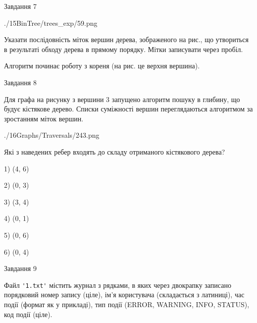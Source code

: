 \documentclass[12pt, ukrainian]{article}
\def\code#1{\Verb!#1!}
\begin{document}
{\vspace{10mm}\par

\newpage
\begin{minipage}[t]{9.7cm}
               
{\begin{center}Завдання {7}\end{center}}
\vspace{-6mm}

\begin{center}
	{./15BinTree/trees_exp/59.png}
\end{center}
Указати послідовність міток вершин дерева, зображеного на рис., що утвориться в результаті обходу дерева в прямому порядку. Мітки записувати через пробіл.\par Алгоритм починає роботу з кореня (на рис. це верхня вершина).\par

\end{minipage}
\vline \hspace{8mm}
\begin{minipage}[t]{8.0cm}
               
{\begin{center}Завдання {8}\end{center}}
\vspace{-6mm}
Для графа на рисунку з вершини 3 запущено алгоритм пошуку в глибину, що будує кістякове дерево. Списки суміжності вершин переглядаються алгоритмом за зростанням міток вершин.\par
\begin{center}
	{./16Graphs/Traversals/243.png}
\end{center}
\par Які з наведених ребер входять до складу отриманого кістякового дерева?\par
1) (4, 6)\par
2) (0, 3)\par
3) (3, 4)\par
4) (0, 1)\par
5) (0, 6)\par
6) (0, 4)\par
{\vskip 15pt} \par

\end{minipage}

               
{\begin{center}Завдання {9}\end{center}}
\vspace{-6mm}
Файл \code{'1.txt'} містить журнал з рядками, в яких через двокрапку записано поряд\-ко\-вий номер запису (ціле), ім'я користувача (складається з латиниці), час події (фор\-мат як у прикладі), тип події (ERROR, WARNING, INFO, STATUS), код події (ціле).

}
\end{document}
